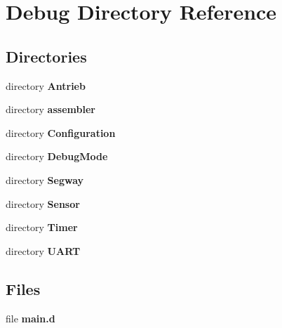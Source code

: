 \section{Debug Directory Reference}
\label{dir_faa8bedbcbaa373d57b77d9219afda20}
\subsection*{Directories}
\begin{DoxyCompactItemize}
\item 
directory {\bf Antrieb}
\item 
directory {\bf assembler}
\item 
directory {\bf Configuration}
\item 
directory {\bf Debug\+Mode}
\item 
directory {\bf Segway}
\item 
directory {\bf Sensor}
\item 
directory {\bf Timer}
\item 
directory {\bf U\+A\+R\+T}
\end{DoxyCompactItemize}
\subsection*{Files}
\begin{DoxyCompactItemize}
\item 
file {\bfseries main.\+d}
\end{DoxyCompactItemize}
